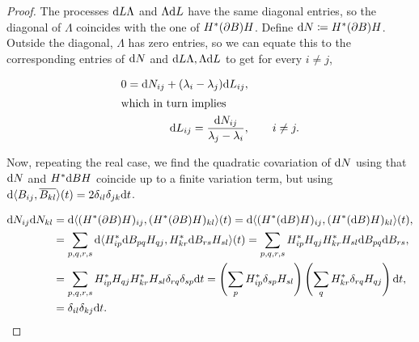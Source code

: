 \begin{proof}
    The processes $\mathrm d L \Lambda$ and $\Lambda \mathrm d L$ have the same diagonal entries, so the diagonal of $\Lambda$ coincides with the one of $H^*(\partial B)H$. Define $\mathrm d N \coloneqq H^*(\partial B)H$. Outside the diagonal, $\Lambda$ has zero entries, so we can equate this to the corresponding entries of $\mathrm d N$ and $\mathrm d L \Lambda, \Lambda \mathrm d L$ to get for every $i\neq j$,

    \begin{align*}
        0 = \mathrm d N_{ij} + (\lambda_i - \lambda_j) \mathrm d L_{ij}&,\\
        \intertext{which in turn implies}
        \mathrm d L_{ij} = \frac{\mathrm d N_{ij}}{\lambda_j - \lambda_i}&, \qquad i \neq j.
    \end{align*}

    Now, repeating the real case, we find the quadratic covariation of $\mathrm d N$ using that $\mathrm d N$ and $H^* \mathrm d B H$ coincide up to a finite variation term, but using $\mathrm d \langle B_{ij}, \overline{B_{kl}} \rangle(t) = 2\delta_{il}\delta_{jk} \mathrm d t$.

    \begin{align*}
        \d N_{ij} \d N_{kl} &= \d \langle (\hermit H(\partial B) H)_{ij}, (\hermit H(\partial B) H)_{kl}  \rangle (t) = \d \langle (\hermit H(\d B) H)_{ij}, (\hermit H(\d B) H)_{kl}  \rangle (t), \\ 
        &= \sum_{p,q,r,s} \d\langle \hermit H_{ip} \d B_{pq} H_{qj}, \hermit H_{kr} \d B_{rs} H_{sl} \rangle(t) = \sum_{p,q,r,s} \hermit H_{ip}H_{qj}\hermit H_{kr}H_{sl}\d B_{pq}\d B_{rs},\\
        &= \sum_{p,q,r,s} \hermit H_{ip}H_{qj}\hermit H_{kr}H_{sl} \delta_{rq}\delta_{sp} \d t = \left( \sum_p \hermit H_{ip}\delta_{sp} H_{sl} \right)\left( \sum_q \hermit H_{kr}\delta_{rq} H_{qj} \right)\d t, \\
        &= \delta_{il}\delta_{kj}\d t. %
    \end{align*}


\end{proof}
